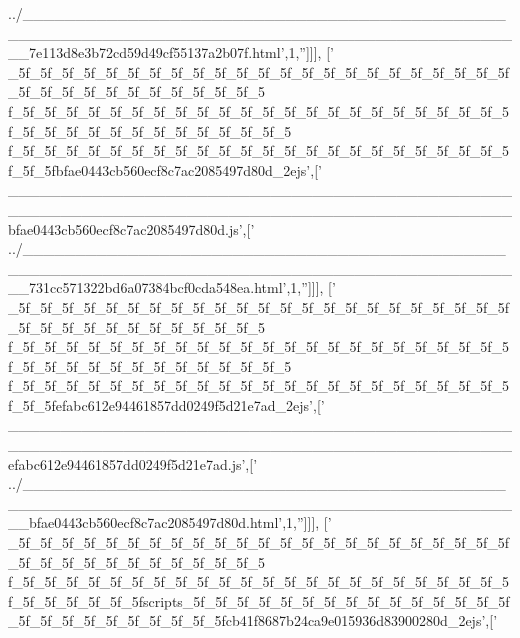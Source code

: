 \begin{DoxyCode}
{      ../\_\_\_\_\_\_\_\_\_\_\_\_\_\_\_\_\_\_\_\_\_\_\_\_\_\_\_\_\_\_\_\_\_\_\_\_\_\_\_\_\_\_\_\_\_\_\_\_\_\_\_\_\_\_\_\_\_\_\_\_\_\_\_\_\_\_\_\_\_\_\_\_\_\_\_\_\_\_\_\_\_\_\_\_\_\_\_\_\_\_\_\_\_\_\_\_7e113d8e3b72cd59d49cf55137a2b07f.html'},1,\textcolor{stringliteral}{''}]]],
  [\textcolor{stringliteral}{'
      \_5f\_5f\_5f\_5f\_5f\_5f\_5f\_5f\_5f\_5f\_5f\_5f\_5f\_5f\_5f\_5f\_5f\_5f\_5f\_5f\_5f\_5f\_5f\_5f\_5f\_5f\_5f\_5f\_5f\_5f\_5f\_5f\_5f\_5f\_5
      f\_5f\_5f\_5f\_5f\_5f\_5f\_5f\_5f\_5f\_5f\_5f\_5f\_5f\_5f\_5f\_5f\_5f\_5f\_5f\_5f\_5f\_5f\_5f\_5f\_5f\_5f\_5f\_5f\_5f\_5f\_5f\_5f\_5f\_5f\_5f\_5
      f\_5f\_5f\_5f\_5f\_5f\_5f\_5f\_5f\_5f\_5f\_5f\_5f\_5f\_5f\_5f\_5f\_5f\_5f\_5f\_5f\_5f\_5f\_5f\_5f\_5fbfae0443cb560ecf8c7ac2085497d80d\_2ejs'},[\textcolor{stringliteral}{'
      \_\_\_\_\_\_\_\_\_\_\_\_\_\_\_\_\_\_\_\_\_\_\_\_\_\_\_\_\_\_\_\_\_\_\_\_\_\_\_\_\_\_\_\_\_\_\_\_\_\_\_\_\_\_\_\_\_\_\_\_\_\_\_\_\_\_\_\_\_\_\_\_\_\_\_\_\_\_\_\_\_\_\_\_\_\_\_\_\_\_\_\_\_\_\_\_bfae0443cb560ecf8c7ac2085497d80d.js'},[\textcolor{stringliteral}{'
      ../\_\_\_\_\_\_\_\_\_\_\_\_\_\_\_\_\_\_\_\_\_\_\_\_\_\_\_\_\_\_\_\_\_\_\_\_\_\_\_\_\_\_\_\_\_\_\_\_\_\_\_\_\_\_\_\_\_\_\_\_\_\_\_\_\_\_\_\_\_\_\_\_\_\_\_\_\_\_\_\_\_\_\_\_\_\_\_\_\_\_\_\_\_\_\_\_731cc571322bd6a07384bcf0cda548ea.html'},1,\textcolor{stringliteral}{''}]]],
  [\textcolor{stringliteral}{'
      \_5f\_5f\_5f\_5f\_5f\_5f\_5f\_5f\_5f\_5f\_5f\_5f\_5f\_5f\_5f\_5f\_5f\_5f\_5f\_5f\_5f\_5f\_5f\_5f\_5f\_5f\_5f\_5f\_5f\_5f\_5f\_5f\_5f\_5f\_5
      f\_5f\_5f\_5f\_5f\_5f\_5f\_5f\_5f\_5f\_5f\_5f\_5f\_5f\_5f\_5f\_5f\_5f\_5f\_5f\_5f\_5f\_5f\_5f\_5f\_5f\_5f\_5f\_5f\_5f\_5f\_5f\_5f\_5f\_5f\_5f\_5
      f\_5f\_5f\_5f\_5f\_5f\_5f\_5f\_5f\_5f\_5f\_5f\_5f\_5f\_5f\_5f\_5f\_5f\_5f\_5f\_5f\_5f\_5f\_5f\_5f\_5fefabc612e94461857dd0249f5d21e7ad\_2ejs'},[\textcolor{stringliteral}{'
      \_\_\_\_\_\_\_\_\_\_\_\_\_\_\_\_\_\_\_\_\_\_\_\_\_\_\_\_\_\_\_\_\_\_\_\_\_\_\_\_\_\_\_\_\_\_\_\_\_\_\_\_\_\_\_\_\_\_\_\_\_\_\_\_\_\_\_\_\_\_\_\_\_\_\_\_\_\_\_\_\_\_\_\_\_\_\_\_\_\_\_\_\_\_\_\_efabc612e94461857dd0249f5d21e7ad.js'},[\textcolor{stringliteral}{'
      ../\_\_\_\_\_\_\_\_\_\_\_\_\_\_\_\_\_\_\_\_\_\_\_\_\_\_\_\_\_\_\_\_\_\_\_\_\_\_\_\_\_\_\_\_\_\_\_\_\_\_\_\_\_\_\_\_\_\_\_\_\_\_\_\_\_\_\_\_\_\_\_\_\_\_\_\_\_\_\_\_\_\_\_\_\_\_\_\_\_\_\_\_\_\_\_\_bfae0443cb560ecf8c7ac2085497d80d.html'},1,\textcolor{stringliteral}{''}]]],
  [\textcolor{stringliteral}{'
      \_5f\_5f\_5f\_5f\_5f\_5f\_5f\_5f\_5f\_5f\_5f\_5f\_5f\_5f\_5f\_5f\_5f\_5f\_5f\_5f\_5f\_5f\_5f\_5f\_5f\_5f\_5f\_5f\_5f\_5f\_5f\_5f\_5f\_5f\_5
      f\_5f\_5f\_5f\_5f\_5f\_5f\_5f\_5f\_5f\_5f\_5f\_5f\_5f\_5f\_5f\_5f\_5f\_5f\_5f\_5f\_5f\_5f\_5f\_5f\_5f\_5f\_5f\_5f\_5fscripts\_5f\_5f\_5f\_5f\_5f\_5f\_5f\_5f\_5f\_5f\_5f\_5f\_5f\_5f\_5f\_5f\_5f\_5f\_5f\_5f\_5f\_5f\_5f\_5f\_5fcb41f8687b24ca9e015936d83900280d\_2ejs'},[\textcolor{stringliteral}{'
}
\end{DoxyCode}
